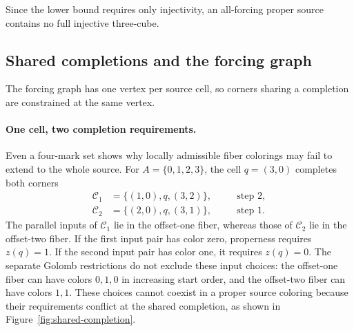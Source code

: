 \documentclass[11pt,a4paper]{article}
\newif\ifshowrevisions
\newenvironment{revision}{\par\begingroup\ifshowrevisions\color{red}\fi}{\par\endgroup}
\theoremstyle{definition}
\numberwithin{equation}{section}
\begin{document}
Since the lower bound requires only injectivity, an all-forcing proper
source contains no full injective three-cube.

\subsection{Shared completions and the forcing graph}
The forcing graph has one vertex per source cell, so corners sharing a
completion are constrained at the same vertex.

\begin{revision}
\paragraph{One cell, two completion requirements.}
Even a four-mark set shows why locally admissible fiber colorings may
fail to extend to the whole source. For $A=\{0,1,2,3\}$, the cell $q=(3,0)$
completes both corners
\[
\begin{aligned}
\mathcal C_1&=\{(1,0),q,(3,2)\},&\quad&\text{step }2,\\
\mathcal C_2&=\{(2,0),q,(3,1)\},&&\text{step }1.
\end{aligned}
\]
The parallel inputs of $\mathcal C_1$ lie in the offset-one fiber,
whereas those of $\mathcal C_2$ lie in the offset-two fiber.
If the first input pair has color zero, properness requires $z(q)=1$.
If the second input pair has color one, it requires $z(q)=0$.
The separate Golomb restrictions do not exclude these input choices:
the offset-one fiber can have colors $0,1,0$ in increasing start order,
and the offset-two fiber can have colors $1,1$.
These choices cannot coexist in a proper source coloring because their
requirements conflict at the shared completion, as shown in
Figure~\ref{fig:shared-completion}.


\end{revision}
\end{document}
